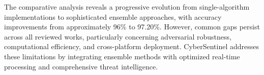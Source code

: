 	The comparative analysis reveals a progressive evolution from single-algorithm implementations to sophisticated ensemble approaches, with accuracy improvements from approximately 96\% to 97.20\%. However, common gaps persist across all reviewed works, particularly concerning adversarial robustness, computational efficiency, and cross-platform deployment. CyberSentinel addresses these limitations by integrating ensemble methods with optimized real-time processing and comprehensive threat intelligence.
	

